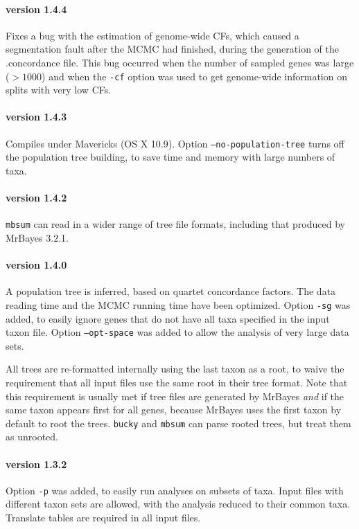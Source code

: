 \documentclass[12pt,english,final,letterpaper]{article}
\begin{document}
\paragraph{version 1.4.4}
Fixes a bug with the estimation of genome-wide CFs, which caused a segmentation fault after 
the MCMC had finished, during the generation of the .concordance file. This bug occurred 
when the number of sampled genes was large ($>1000$) and when the {\tt -cf} option was
used to get genome-wide information on splits with very low CFs.

\paragraph{version 1.4.3}
Compiles under Mavericks (OS X 10.9). Option {\tt --no-population-tree}
turns off the population tree building, to save time and memory with large numbers of taxa. 

\paragraph{version 1.4.2}
{\tt mbsum} can read in a wider range of tree file formats, 
including that produced by MrBayes 3.2.1. 

\paragraph{version 1.4.0}
A population tree is inferred, based on quartet concordance factors. 
The data reading time and the MCMC running time have been optimized. 
Option {\tt -sg} was added, to easily ignore genes that do not have all
taxa specified in the input taxon file.
Option {\tt --opt-space} was added to allow the analysis of very large data sets.

All trees are re-formatted internally using the last taxon as a root,
to waive the requirement that all input files use the same root in their
tree format. Note that this requirement is usually met if tree files are 
generated by MrBayes {\it and} if the same taxon appears first for all genes, 
because MrBayes uses the first taxon by default to root the trees. 
{\tt bucky} and {\tt mbsum} can parse rooted trees, but treat them as unrooted.

\paragraph{version 1.3.2}
Option {\tt -p} was added, to easily run analyses on
subsets of taxa. Input files with different taxon sets are allowed, 
with the analysis reduced to their common taxa. Translate tables are 
required in all input files.
\end{document}
